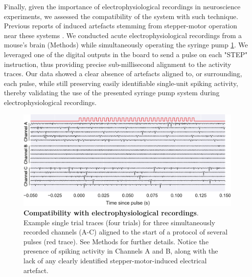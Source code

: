 Finally, given the importance of electrophysiological recordings in neuroscience experiments, we assessed the compatibility of the system with such technique. Previous reports of induced artefacts stemming from stepper-motor operation near these systems \citep{Amarante2019}. We conducted acute electrophysiological recordings from a mouse's brain (Methods) while simultaneously operating the syringe pump \cref{fig:Ephys}. 
We leveraged one of the digital outputs in the board to send a pulse on each "STEP" instruction, thus providing precise sub-millisecond alignment to the activity traces. 
Our data showed a clear absence of artefacts aligned to, or surrounding, each pulse, while still preserving easily identifiable single-unit spiking activity, thereby validating the use of the presented syringe pump system during electrophysiological recordings.

\begin{figure}[ht] 
	\centering
	\includegraphics[width=1.0\linewidth]{Figures/Artboard 7.pdf}
	\caption{\textbf{Compatibility with electrophysiological recordings}.\\
	Example single trial traces (four trials) for three simultaneously recorded channels (A-C) aligned to the start of a protocol of several pulses (red trace). See Methods for further details. Notice the presence of spiking activity in Channels A and B, along with the lack of any clearly identified stepper-motor-induced electrical artefact.}	
	\label{fig:Ephys}
\end{figure}





